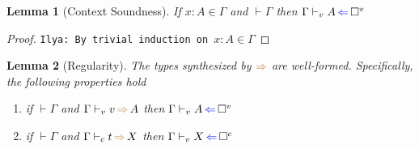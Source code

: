 \documentclass[a4,natbib=false]{article}
\newtheorem{lemma}{Lemma}
\newcommand{\ilyam}[1]{{\color{red} \texttt{Ilya:  #1}}}
\newcommand{\unival}{\square^{v}}
\newcommand{\unicomp}{\square^{c}}
\newcommand{\judgectx}[2]{{#1} \vdash {#2}}
\newcommand{\checks}{{\color{blue} \Leftarrow}}
\newcommand{\infers}{{\color{brown} \Rightarrow}}
\newcommand{\judgecInfer}[3]{{#1} \vdash_{c} {#2} \, \infers \, {#3}}
\newcommand{\judgevCheck}[3]{{#1} \vdash_{v} {#2} \, \checks \, {#3}}
\newcommand{\judgevInfer}[3]{{#1} \vdash_{v} {#2} \, \infers \, {#3}}
\newcommand{\judgeInctx}[2]{{#1} \in {#2}}
\begin{document}
\begin{lemma}[Context Soundness]
  \label{lemma:ctx-soundness}
  If $\judgeInctx{x:A}{\Gamma}$ and $\judgectx{}{\Gamma}$ then $\judgevCheck{\Gamma}{A}{\unival}$
\end{lemma}
\begin{proof}
  \ilyam{By trivial induction on $\judgeInctx{x:A}{\Gamma}$}
\end{proof}

\begin{lemma}[Regularity]
  The types synthesized by $\infers$ are well-formed. Specifically, the following properties hold
  \begin{enumerate}
  \item if $\judgectx{}{\Gamma}$ and $\judgevInfer{\Gamma}{v}{A}$ then $\judgevCheck{\Gamma}{A}{\unival}$
  \item if $\judgectx{}{\Gamma}$ and $\judgecInfer{\Gamma}{t}{X}$ then $\judgevCheck{\Gamma}{X}{\unicomp}$
  \end{enumerate}
\end{lemma}
\end{document}
